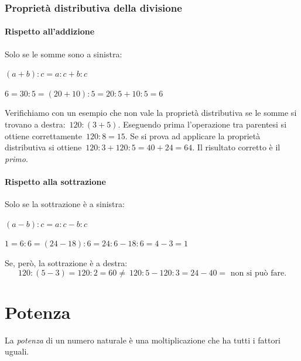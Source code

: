 \subsubsection{Proprietà distributiva della divisione}

\paragraph{Rispetto all'addizione}
Solo se le somme sono a sinistra:

\vspace{.5em}
\begin{minipage}{.38\textwidth}
 \((a+b): c=a:c+b:c\)
\end{minipage}
\hfill
\begin{minipage}{.58\textwidth}
 \(6 = 30 : 5 = (20+10):5=20:5+10:5=6\)
\end{minipage}

Verifichiamo con un esempio che non vale la proprietà distributiva se le 
somme 
si trovano a destra:~\(120:(3+5)\).
Eseguendo prima l'operazione tra parentesi si ottiene 
correttamente~\(120:8=15\). Se si prova ad applicare
la proprietà distributiva si ottiene~\(120:3+120:5=40+24=64\). 
Il risultato corretto è il \emph{primo}.

\paragraph{Rispetto alla sottrazione}
Solo se la sottrazione è a sinistra:

\vspace{.5em}
\begin{minipage}{.38\textwidth}
 \((a-b):c=a:c-b:c\)
\end{minipage}
\hfill
\begin{minipage}{.58\textwidth}
 \(1 = 6 : 6 = (24-18) : 6 = 24 : 6 - 18 : 6 = 4 - 3 = 1\)
\end{minipage}

Se, però, la sottrazione è a destra:
\[120:(5-3)=120:2=60\neq~120:5-120:3=24-40=\text{ non si può fare.}\]


\section{Potenza}
\label{sec:01_potenza}

La \emph{potenza} di un numero naturale è una moltiplicazione che ha tutti 
i fattori uguali.

